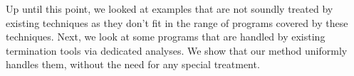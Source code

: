 \documentclass[preprint]{sigplanconf}
\theoremstyle{definition}
\begin{document}
Up until this point, we looked at examples that are not soundly treated by existing techniques as they 
don't fit in the range of programs covered by these techniques.
Next, we look at some programs that are handled by existing termination tools via dedicated analyses. We show that our method 
uniformly handles them, without the need for any special treatment.

\end{document}
